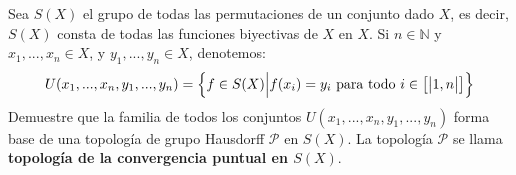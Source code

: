 \documentclass[12pt]{report}
\theoremstyle{largebreak}
\newcommand{\natint}[1]{\ensuremath{\left[\big|#1\big|\right]}}
\begin{document}
    \begin{excer}
        Sea $S(X)$ el grupo de todas las permutaciones de un conjunto dado $X$, es decir, $S(X)$ consta de todas las funciones biyectivas de $X$ en $X$. Si $n\in\mathbb{N}$ y $x_1,...,x_n\in X$, y $y_1,...,y_n\in X$, denotemos:
        \begin{equation*}
            U(x_1,...,x_n,y_1,...,y_n)=\left\{f\in S(X)\Big| f(x_i)=y_i\textup{ para todo }i\in\natint{1,n} \right\}
        \end{equation*}
        Demuestre que la familia de todos los conjuntos $U(x_1,...,x_n,y_1,...,y_n)$ forma base de una topología de grupo Hausdorff $\mathcal{P}$ en $S(X)$. La topología $\mathcal{P}$ se llama \textbf{topología de la convergencia puntual en $S(X)$}.
    \end{excer}
\end{document}
